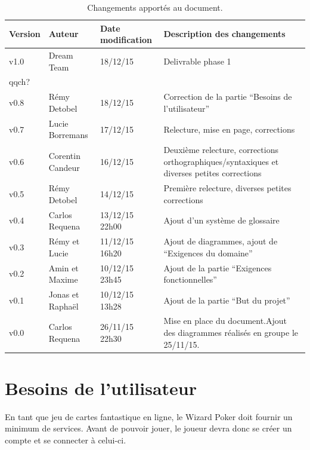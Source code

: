 \documentclass[11pt,a4paper]{article}
\begin{document}
\begin{table}[h]
  \centering
  \begin{tabular}[ht]{|l|l|l|p{18em}|}
    \hline
    \textbf{Version}
    & \textbf{Auteur}
    & \textbf{Date modification}
    & \textbf{Description des changements}\\ \hline \hline
    v1.0 & Dream Team & 18/12/15 & Delivrable phase 1 \\ \hline
    qqch? &  &  &  \\ \hline
    v0.8 & Rémy Detobel & 18/12/15 & Correction de la partie ``Besoins de l'utilisateur'' \\ \hline
    v0.7 & Lucie Borremans & 17/12/15 & Relecture, mise en page, corrections \\ \hline
     v0.6 & Corentin Candeur & 16/12/15 & Deuxième relecture, corrections orthographiques/syntaxiques et diverses petites corrections \\ \hline
    v0.5 & Rémy Detobel & 14/12/15 & Première relecture, diverses petites corrections \\ \hline
    v0.4 & Carlos Requena  & 13/12/15 22h00 & Ajout d'un système de glossaire \\ \hline
    v0.3 & Rémy et Lucie  & 11/12/15 16h20 & Ajout de diagrammes, ajout de ``Exigences du domaine'' \\ \hline
    v0.2 & Amin et Maxime & 10/12/15 23h45 & Ajout de la partie ``Exigences fonctionnelles''\\ \hline
    v0.1 & Jonas et Raphaël & 10/12/15 13h28 & Ajout de la partie ``But du projet''\\ \hline
    v0.0 & Carlos Requena & 26/11/15 22h30 & Mise en place du document.Ajout des diagrammes réalisés en groupe le 25/11/15.\\ \hline
  \end{tabular}
  \caption{Changements apportés au document.}
  \label{tab:hist}
\end{table}


\glsaddall
\printnoidxglossaries


\section{Besoins de l'utilisateur}
\label{sec:besoins}

En tant que jeu de cartes fantastique en ligne, le Wizard Poker doit fournir un minimum de services. Avant de pouvoir jouer, le joueur devra donc se créer un compte et se connecter à celui-ci.
\end{document}
